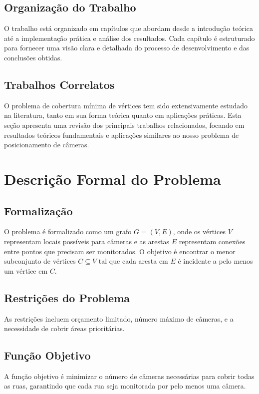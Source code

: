 \documentclass[12pt, a4paper]{report}
\begin{document}
\section{Organização do Trabalho}
O trabalho está organizado em capítulos que abordam desde a introdução teórica até a implementação prática e análise dos resultados. Cada capítulo é estruturado para fornecer uma visão clara e detalhada do processo de desenvolvimento e das conclusões obtidas.

\section{Trabalhos Correlatos}
O problema de cobertura mínima de vértices tem sido extensivamente estudado na literatura, tanto em sua forma teórica quanto em aplicações práticas. Esta seção apresenta uma revisão dos principais trabalhos relacionados, focando em resultados teóricos fundamentais e aplicações similares ao nosso problema de posicionamento de câmeras.

\chapter{Descrição Formal do Problema}

\section{Formalização}
O problema é formalizado como um grafo \(G = (V, E)\), onde os vértices \(V\) representam locais possíveis para câmeras e as arestas \(E\) representam conexões entre pontos que precisam ser monitorados. O objetivo é encontrar o menor subconjunto de vértices \(C \subseteq V\) tal que cada aresta em \(E\) é incidente a pelo menos um vértice em \(C\).

\section{Restrições do Problema}
As restrições incluem orçamento limitado, número máximo de câmeras, e a necessidade de cobrir áreas prioritárias.

\section{Função Objetivo}
A função objetivo é minimizar o número de câmeras necessárias para cobrir todas as ruas, garantindo que cada rua seja monitorada por pelo menos uma câmera.
\end{document}
